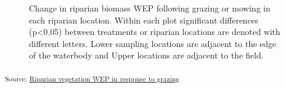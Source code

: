 \documentclass[
]{agujournal2019}
\begin{document}
\begin{figure}[H]


\caption{\label{fig-vegetation-wep}Change in riparian biomass WEP
following grazing or mowing in each riparian location. Within each plot
significant differences (p\textless0.05) between treatments or riparian
locations are denoted with different letters. Lower sampling locations
are adjacent to the edge of the waterbody and Upper locations are
adjacent to the field.}

\end{figure}%

\textsubscript{Source:
\href{https://alex-koiter.github.io/riparian-grazing-manuscript/notebooks/01_Biomass_analysis-preview.html\#cell-fig-vegetation-WEP}{Riparian
vegetation WEP in response to grazing}}
\end{document}
